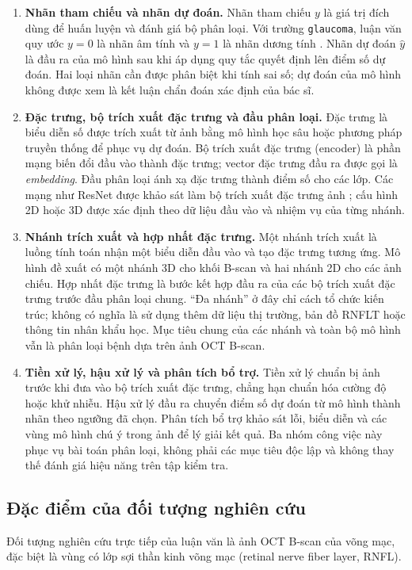 \documentclass[14pt,a4paper,oneside]{extreport}
\begin{document}
\begin{enumerate}[label=\arabic*.,leftmargin=1cm]
  \item \textbf{Nhãn tham chiếu và nhãn dự đoán.}
  Nhãn tham chiếu $y$ là giá trị đích dùng để huấn luyện và đánh
  giá bộ phân loại. Với trường \texttt{glaucoma}, luận văn quy
  ước $y=0$ là nhãn âm tính và $y=1$ là nhãn dương tính
  \cite{harvardgfRepo}. Nhãn dự đoán $\widehat y$ là đầu ra của
  mô hình sau khi áp dụng quy tắc quyết định lên điểm số dự đoán.
  Hai loại nhãn cần được phân biệt khi tính sai số; dự đoán của
  mô hình không được xem là kết luận chẩn đoán xác định của bác sĩ.

  \item \textbf{Đặc trưng, bộ trích xuất đặc trưng và đầu phân loại.}
  Đặc trưng là biểu diễn số được trích xuất từ ảnh bằng mô hình học sâu
  hoặc phương pháp truyền thống để phục vụ dự đoán. Bộ trích xuất
  đặc trưng (encoder) là phần mạng biến đổi đầu vào thành đặc trưng;
  vector đặc trưng đầu ra được gọi là \textit{embedding}. Đầu
  phân loại ánh xạ đặc trưng thành điểm số cho các lớp. Các mạng
  như ResNet được khảo sát làm bộ trích xuất đặc trưng ảnh
  \cite{he2016resnet}; cấu hình 2D hoặc 3D được xác định theo
  dữ liệu đầu vào và nhiệm vụ của từng nhánh.

  \item \textbf{Nhánh trích xuất và hợp nhất đặc trưng.}
  Một nhánh trích xuất là luồng tính toán nhận một biểu diễn đầu vào và tạo
  đặc trưng tương ứng. Mô hình đề xuất có một nhánh 3D cho khối
  B-scan và hai nhánh 2D cho các ảnh chiếu. Hợp nhất đặc trưng là
  bước kết hợp đầu ra của các bộ trích xuất đặc trưng trước đầu phân loại chung.
  ``Đa nhánh'' ở đây chỉ cách tổ chức kiến trúc; không có nghĩa là
  sử dụng thêm dữ liệu thị trường, bản đồ RNFLT hoặc thông tin
  nhân khẩu học. Mục tiêu chung của các nhánh và toàn bộ mô hình vẫn là phân loại bệnh dựa trên ảnh OCT B-scan.

  \item \textbf{Tiền xử lý, hậu xử lý và phân tích bổ trợ.}
  Tiền xử lý chuẩn bị ảnh trước khi đưa vào bộ trích xuất đặc trưng, chẳng hạn
  chuẩn hóa cường độ hoặc khử nhiễu. Hậu xử lý đầu ra chuyển điểm
  số dự đoán từ mô hình thành nhãn theo ngưỡng đã chọn. Phân tích bổ trợ khảo sát lỗi,
  biểu diễn và các vùng mô hình chú ý trong ảnh để lý giải kết quả. Ba nhóm công
  việc này phục vụ bài toán phân loại, không phải các mục tiêu
  độc lập và không thay thế đánh giá hiệu năng trên tập kiểm tra.
\end{enumerate}

\subsection{Đặc điểm của đối tượng nghiên cứu}
Đối tượng nghiên cứu trực tiếp của luận văn là ảnh OCT B-scan của võng
mạc, đặc biệt là vùng có lớp sợi thần kinh võng mạc (retinal nerve fiber
layer, RNFL). 
\end{document}
